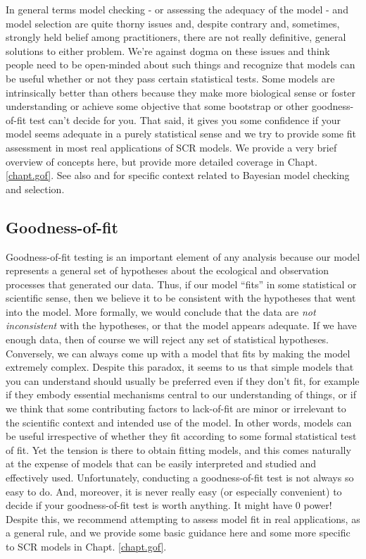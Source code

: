 In general terms model checking - or assessing the adequacy of the
model - and model selection are quite thorny issues and, despite
contrary and, sometimes, strongly held belief among practitioners, there are not
really definitive, general solutions to either problem. We're against
dogma on these issues and think people need to be open-minded about
such things and recognize that models can be useful whether or not
they pass certain statistical tests. Some models are intrinsically
better than others because they make more biological sense or foster
understanding or achieve some objective that some  bootstrap
or other goodness-of-fit test can't decide for you. That said, it
gives you some confidence if your model seems adequate in a purely statistical
sense and we try to
provide some fit assessment in most real applications of SCR models.
We provide a very brief overview of concepts here, but provide more
detailed coverage in Chapt. \ref{chapt.gof}.
See also
\citet[][ch. xyz]{kery:2010} and
\citet[][ch. xyz]{link_barker:2009}
for specific context related to Bayesian
model checking and selection.

\subsection{Goodness-of-fit}
\label{glms.sec.gof}

Goodness-of-fit testing is an important element of any analysis
because  our model represents a general set of hypotheses
about the ecological and observation processes that generated our
data. Thus, if our model ``fits'' in some statistical or scientific
sense, then we believe it to be consistent with the hypotheses that
went into the model. More formally, we would conclude that the data
are {\it not inconsistent} with the hypotheses, or that the model
appears adequate. If we have enough
data, then of course we will reject any set of statistical hypotheses.
Conversely, we can always come up with a model that fits by making the
model extremely complex. Despite this paradox, it seems to us that
simple models that you can understand should usually be preferred even
if they don't fit, for example if they embody essential mechanisms
central to our understanding of things, or
if we think that some contributing factors to lack-of-fit are minor or
irrelevant to the scientific context and intended use of the model.
In other words, models can be useful irrespective of whether they fit
according to some formal statistical test of fit.  Yet
the tension is there to obtain fitting models, and this comes naturally at
the expense of models that can be easily interpreted and studied and
effectively used.
Unfortunately, conducting a goodness-of-fit test is
not always so easy to do. And, moreover, it is never really easy (or
especially convenient) to decide if your goodness-of-fit test is worth
anything. It might have 0 power!
Despite this,
we recommend attempting to assess model fit in real applications,
as a general rule, and we provide some basic guidance here and some more
specific to SCR models in
Chapt. \ref{chapt.gof}.

